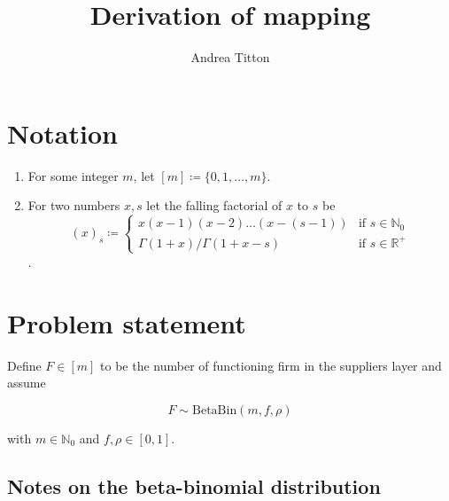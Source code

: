 \documentclass[american, abstract=on]{scrartcl}
\author{Andrea Titton}
\title{Derivation of mapping}
\theoremstyle{plain}
\renewcommand{\Re}{\mathbb{R}}
\newcommand{\Beta}{\text{Beta}}
\newcommand{\Bin}{\text{Bin}}
\begin{document}
\maketitle

\section{Notation}

\begin{enumerate}
    \item For some integer $m$, let $[m] \coloneqq \{0, 1, \ldots, m\}$.
    \item For two numbers $x, s$ let the falling factorial of $x$ to $s$ be \begin{equation}
        (x)_s \coloneqq \begin{cases} x(x - 1)(x - 2)\ldots(x - (s - 1)) & \text{if } s \in \mathbb{N}_0 \\
       \Gamma(1 + x) \Big/ \Gamma(1 + x - s)& \text{if } s \in \Re^{+}
        \end{cases}
    \end{equation}.
\end{enumerate}

\section{Problem statement}

Define $F \in [m]$ to be the number of functioning firm in the suppliers layer and assume 

\begin{equation}
    F \sim \Beta\Bin(m, f, \rho)
\end{equation}

with $m \in \mathbb{N}_0$ and $f, \rho \in [0, 1]$.

\subsection{Notes on the beta-binomial distribution}
\end{document}
